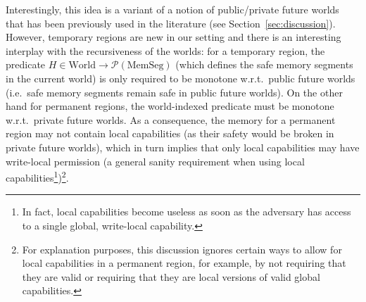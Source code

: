 \documentclass[format=acmsmall, review=true, screen=true]{acmart}
\renewcommand{\sectionname}{Section}
\newcommand{\powerset}[1]{\mathcal{P}(#1)}
\newcommand{\plaindom}[1]{\mathrm{#1}}
\newcommand{\HeapSegments}{\plaindom{MemSeg}}
\newcommand{\MemSegments}{\HeapSegments}
\newcommand{\Worlds}{\plaindom{World}}
\newenvironment{toplas}{}{}
\begin{document}
\begin{toplas}
Interestingly, this idea is a variant of a notion of public/private future worlds that has been previously used in the literature (see \sectionname~\ref{sec:discussion}).
However, temporary regions are new in our setting and there is an interesting interplay with the recursiveness of the worlds: for a temporary region, the predicate $H \in \Worlds \rightarrow \powerset{\MemSegments}$ (which defines the safe memory segments in the current world) is only required to be monotone w.r.t.\ public future worlds (i.e.\ safe memory segments remain safe in public future worlds).
On the other hand for permanent regions, the world-indexed predicate must be monotone w.r.t.\ private future worlds.
As a consequence, the memory for a permanent region may not contain local capabilities (as their safety would be broken in private future worlds), which in turn implies that only local capabilities may have write-local permission (a general sanity requirement when using local capabilities\footnote{In fact, local capabilities become useless as soon as the adversary has access to a single global, write-local capability.})\footnote{For explanation purposes, this discussion ignores certain ways to allow for local capabilities in a permanent region, for example, by not requiring that they are valid or requiring that they are local versions of valid global capabilities.}.
\end{toplas}
\end{document}
